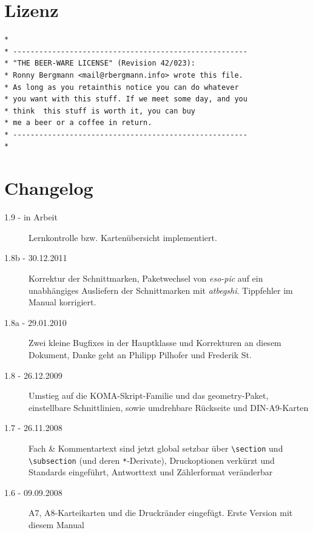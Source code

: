 \documentclass[a4paper,DIV=calc]{scrartcl}
\begin{document}
\section{Lizenz}
\begin{lstlisting}[basicstyle=\sffamily, numbers=none]
*
* ------------------------------------------------------
* "THE BEER-WARE LICENSE" (Revision 42/023):
* Ronny Bergmann <mail@rbergmann.info> wrote this file.
* As long as you retainthis notice you can do whatever
* you want with this stuff. If we meet some day, and you
* think  this stuff is worth it, you can buy
* me a beer or a coffee in return.
* ------------------------------------------------------
*
\end{lstlisting}
\newpage\section{Changelog}
\begin{description}
	\item[1.9 - in Arbeit] Lernkontrolle bzw. Kartenübersicht implementiert.
	\item[1.8b - 30.12.2011] Korrektur der Schnittmarken, Paketwechsel von \emph{eso-pic} auf ein unabhängiges Ausliefern der Schnittmarken mit \emph{atbegshi}. Tippfehler im Manual korrigiert.
	\item[1.8a - 29.01.2010] Zwei kleine Bugfixes in der Hauptklasse und Korrekturen an diesem Dokument, Danke geht an Philipp Pilhofer und Frederik St.
	\item[1.8 - 26.12.2009] Umstieg auf die KOMA-Skript-Familie und das geometry-Paket, einstellbare Schnittlinien, sowie umdrehbare Rückseite und DIN-A9-Karten
	\item[1.7 - 26.11.2008] Fach \& Kommentartext sind jetzt global setzbar über \lstinline!\section! und \lstinline!\subsection! (und deren \lstinline!*!-Derivate), Druckoptionen verkürzt und Standards eingeführt, Antworttext und Zählerformat veränderbar
	\item[1.6 - 09.09.2008] A7, A8-Karteikarten und die Druckränder eingefügt. Erste Version mit diesem Manual
\end{description}
\end{document}
